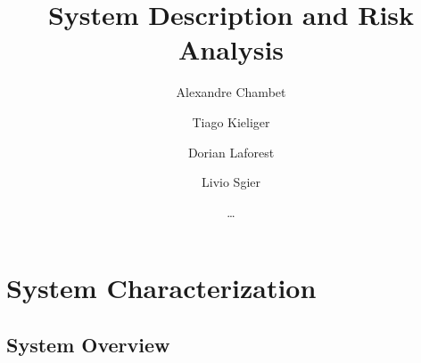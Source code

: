 \documentclass[english]{article}
\title{\huge\sffamily\bfseries System Description and Risk Analysis}
\author{Alexandre Chambet \and Tiago Kieliger \and Dorian Laforest \and Livio Sgier}
\date{\dots}
\begin{document}
\maketitle


\tableofcontents
\pagebreak









\section{System Characterization}

\subsection{System Overview}\label{ssec:system_overview}
\end{document}
